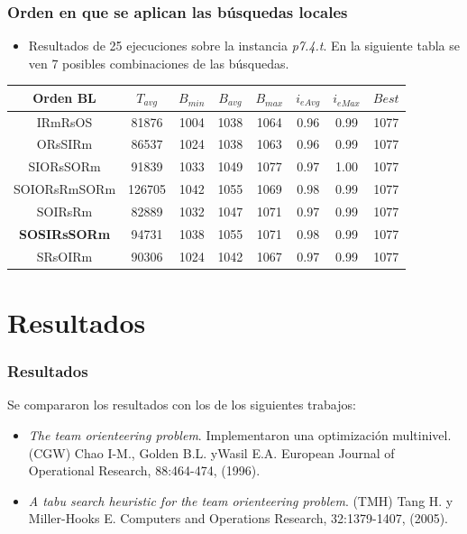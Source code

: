 \documentclass{beamer}
\begin{document}

\begin{frame}
\frametitle{Orden en que se aplican las búsquedas locales}

\begin{itemize}
    \item Resultados de 25 ejecuciones sobre la instancia \textit{p7.4.t}. En la siguiente tabla se ven 7 posibles combinaciones de las búsquedas.
\end{itemize}

\begin{table}
\begin{center}
\begin{tabular}{ |c|c|c|c|c|c|c|c| } 
\hline
Orden BL & $T_{avg}$ & $B_{min}$ & $B_{avg}$ & $B_{max}$ & $i_{eAvg}$ & $i_{eMax}$ & $Best$ \\
\hline
IRmRsOS & 81876 & 1004 & 1038 & 1064 & 0.96 & 0.99 & 1077  \\
ORsSIRm & 86537 & 1024 & 1038 & 1063 & 0.96 & 0.99 & 1077  \\
SIORsSORm & 91839 & 1033 & 1049 & 1077 & 0.97 & 1.00 & 1077  \\
SOIORsRmSORm & 126705 & 1042 & 1055 & 1069 & 0.98 & 0.99 & 1077  \\
SOIRsRm & 82889 & 1032 & 1047 & 1071 & 0.97 & 0.99 & 1077  \\
\textbf{SOSIRsSORm} & 94731 & 1038 & 1055 & 1071 & 0.98 & 0.99 & 1077  \\
SRsOIRm & 90306 & 1024 & 1042 & 1067 & 0.97 & 0.99 & 1077  \\
\hline
\end{tabular}
\end{center}
\label{tab:resultadosListaLS2}
\end{table}

\end{frame}


\section{Resultados}

\begin{frame}
\frametitle{Resultados}

Se compararon los resultados con los de los siguientes trabajos:

\begin{itemize}
	\item \textit{The team orienteering problem}. Implementaron una optimización multinivel. (CGW) Chao I-M., Golden B.L. yWasil E.A. European Journal of Operational Research, 88:464-474, (1996).
	\pause
	\item \textit{A tabu search heuristic for the team orienteering problem}. (TMH) Tang H. y Miller-Hooks E. Computers and Operations Research, 32:1379-1407, (2005).
\end{itemize}
\end{frame}
\end{document}
